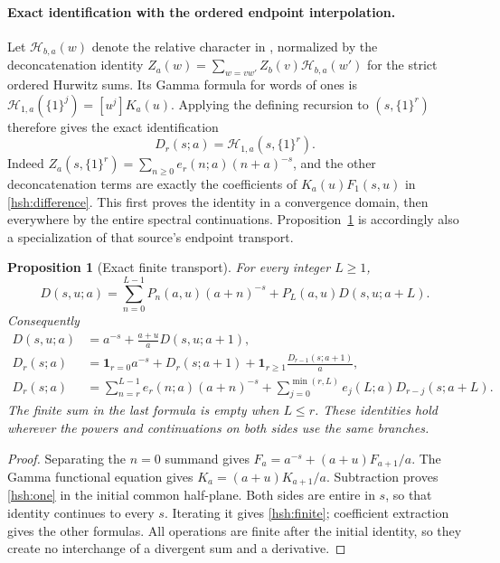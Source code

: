 \documentclass[11pt,a4paper]{article}
\numberwithin{equation}{section}
\newtheorem{proposition}[theorem]{Proposition}
\theoremstyle{definition}
\theoremstyle{remark}
\begin{document}
\paragraph{Exact identification with the ordered endpoint interpolation.}
Let $\mathcal H_{b,a}(w)$ denote the relative character in
\cite{RepoIndependent}, normalized by the deconcatenation identity
$Z_a(w)=\sum_{w=vw'}Z_b(v)\mathcal H_{b,a}(w')$ for the
strict ordered Hurwitz sums.  Its Gamma formula for words of ones is
$\mathcal H_{1,a}(\{1\}^j)=[u^j]K_a(u)$.  Applying the defining
recursion to $(s,\{1\}^r)$ therefore gives the exact identification
\begin{equation}\label{hsh:relativecharacter}
          D_r(s;a)=\mathcal H_{1,a}(s,\{1\}^r).
\end{equation}
Indeed $Z_a(s,\{1\}^r)=\sum_{n\geq0}e_r(n;a)(n+a)^{-s}$,
and the other deconcatenation terms are exactly the coefficients
of $K_a(u)F_1(s,u)$ in \eqref{hsh:difference}.  This first proves
the identity in a convergence domain, then everywhere by the entire
spectral continuations.  Proposition~\ref{hsh:transport} is accordingly
also a specialization of that source's endpoint transport.

\begin{proposition}[Exact finite transport]\label{hsh:transport}
For every integer $L\geq1$,
\begin{equation}\label{hsh:finite}
 D(s,u;a)=\sum_{n=0}^{L-1}P_n(a,u)(a+n)^{-s}
                       +P_L(a,u)D(s,u;a+L).
\end{equation}
Consequently
\begin{align}
 D(s,u;a)&=a^{-s}+\frac{a+u}{a}D(s,u;a+1),
                                                     \label{hsh:one}\\
 D_r(s;a)&=\mathbf1_{r=0}a^{-s}+D_r(s;a+1)
                      +\mathbf1_{r\geq1}\frac{D_{r-1}(s;a+1)}a,
                                                     \label{hsh:depthshift}\\
 D_r(s;a)&=\sum_{n=r}^{L-1}e_r(n;a)(a+n)^{-s}
          +\sum_{j=0}^{\min(r,L)}e_j(L;a)D_{r-j}(s;a+L).
                                                     \label{hsh:depthfinite}
\end{align}
The finite sum in the last formula is empty when $L\leq r$.
These identities hold wherever the powers and continuations on both
sides use the same branches.
\end{proposition}

\begin{proof}
Separating the $n=0$ summand gives
$F_a=a^{-s}+(a+u)F_{a+1}/a$.  The Gamma functional equation gives
$K_a=(a+u)K_{a+1}/a$.  Subtraction proves
\eqref{hsh:one} in the initial common half-plane.  Both sides are
entire in $s$, so that identity continues to every $s$.  Iterating it
gives \eqref{hsh:finite}; coefficient extraction gives the other
formulas.  All operations are finite after the initial identity, so
they create no interchange of a divergent sum and a derivative.
\end{proof}
\end{document}
